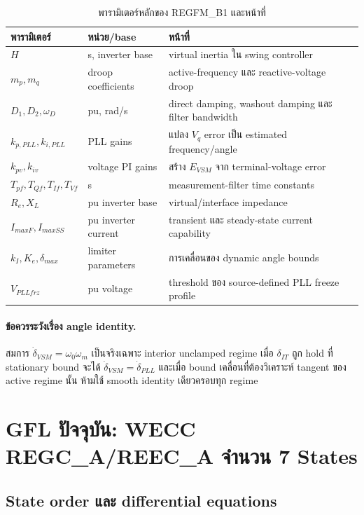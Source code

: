 \documentclass[12pt,a4paper]{article}
\begin{document}
\begin{table}[H]\centering\small
\caption{พารามิเตอร์หลักของ REGFM\_B1 และหน้าที่}\label{tab:gfm-params}
\begin{tabularx}{\textwidth}{p{}p{}X}
\toprule
พารามิเตอร์ & หน่วย/base & หน้าที่ \\ \midrule
$H$ & s, inverter base & virtual inertia ใน swing controller \\
$m_p,m_q$ & droop coefficients & active-frequency และ reactive-voltage droop \\
$D_1,D_2,\omega_D$ & pu, rad/s & direct damping, washout damping และ filter bandwidth \\
$k_{p,PLL},k_{i,PLL}$ & PLL gains & แปลง $V_q$ error เป็น estimated frequency/angle \\
$k_{pv},k_{iv}$ & voltage PI gains & สร้าง $E_{VSM}$ จาก terminal-voltage error \\
$T_{pf},T_{Qf},T_{If},T_{Vf}$ & s & measurement-filter time constants \\
$R_e,X_L$ & pu inverter base & virtual/interface impedance \\
$I_{maxF},I_{maxSS}$ & pu inverter current & transient และ steady-state current capability \\
$k_I,K_e,\delta_{max}$ & limiter parameters & การเคลื่อนของ dynamic angle bounds \\
$V_{PLLfrz}$ & pu voltage & threshold ของ source-defined PLL freeze profile \\
\bottomrule
\end{tabularx}
\end{table}

\paragraph{ข้อควรระวังเรื่อง angle identity.}
สมการ $\dot\delta_{VSM}=\omega_0\omega_m$ เป็นจริงเฉพาะ interior unclamped regime
เมื่อ $\delta_{IT}$ ถูก hold ที่ stationary bound จะได้
$\dot\delta_{VSM}=\dot\delta_{PLL}$ และเมื่อ bound เคลื่อนที่ต้องวิเคราะห์ tangent
ของ active regime นั้น ห้ามใช้ smooth identity เดียวครอบทุก regime

\section{GFL ปัจจุบัน: WECC REGC\_A/REEC\_A จำนวน 7 States}

\subsection{State order และ differential equations}
\end{document}
